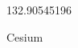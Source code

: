 \documentclass[12pt]{article}
\begin{document}
\hfill{}
\vfill
\begin{center}
  {\fontsize{50}{60}
  }

  132.90545196

Cesium
\end{center}
\vfill
\end{document}
